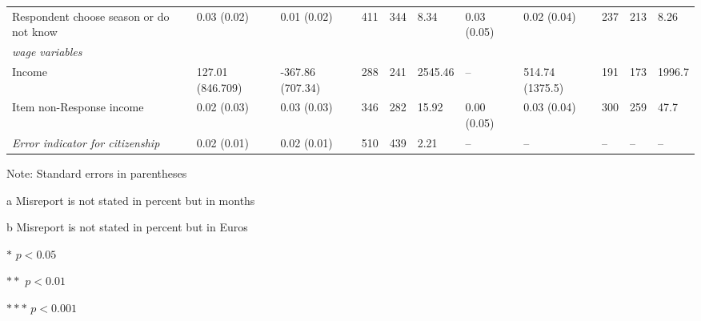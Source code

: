 \begin{landscape}
\begin{threeparttable}
\begin{tabular}{p{4.5cm}p{1.5cm}p{1.5cm}p{1cm}p{1cm}p{1.5cm}p{1.5cm}p{1.5cm}p{1cm}p{1cm}p{1.5cm}}
Respondent choose season or do not know  & 0.03 (0.02)      & 0.01 (0.02)      & 411        & 344        & 8.34                  & 0.03 (0.05)  & 0.02 (0.04)      & 237 & 213      & 8.26                  \\ \addlinespace
\textit{wage variables}                           &                  &                  &            &            &                       &              &                  &     &          &                       \\ \hline \addlinespace
Income                              & 127.01 (846.709) & -367.86 (707.34) & 288        & 241        & 2545.46\tnote{b}                & --            & 514.74 (1375.5)  & 191 & 173      & 1996.7\tnote{b}             \\ \addlinespace
Item non-Response income                 & 0.02 (0.03)       & 0.03 (0.03)       & 346        & 282        & 15.92                 & 0.00 (0.05)  & 0.03 (0.04)      & 300 & 259      & 47.7                  \\\addlinespace
\textit{Error indicator for citizenship} & 0.02 (0.01)      & 0.02 (0.01)      & 510        & 439        & 2.21                  & --            & --                & --   & --        & --   \\ \bottomrule                 
\end{tabular}
\vspace{.5em}
    \begin{tablenotes}\small
    \item Note: Standard errors in parentheses
      
    \item [a] Misreport is not stated in percent but in months \newline
    \item [b] Misreport is not stated in percent but in Euros 
      
    \item $*$ $p<0.05$
    \item $**$ $p<0.01$
    \item $***$ $p<0.001$
    \end{tablenotes}
\end{threeparttable}
\end{landscape}